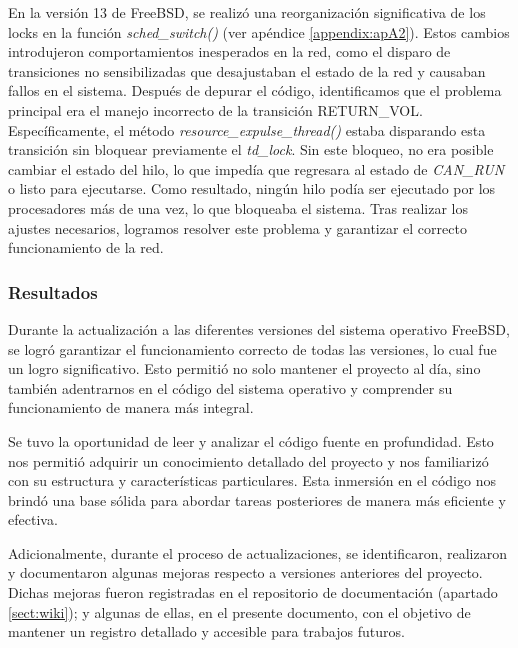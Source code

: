 En la versión 13 de FreeBSD, se realizó una reorganización significativa de los locks en la función \textit{sched\_switch()} (ver apéndice \ref{appendix:apA2}). Estos cambios introdujeron comportamientos inesperados en la red, como el disparo de transiciones no sensibilizadas que desajustaban el estado de la red y causaban fallos en el sistema. Después de depurar el código, identificamos que el problema principal era el manejo incorrecto de la transición RETURN\_VOL. Específicamente, el método \textit{resource\_expulse\_thread()} estaba disparando esta transición sin bloquear previamente el \textit{td\_lock}. Sin este bloqueo, no era posible cambiar el estado del hilo, lo que impedía que regresara al estado de \textit{CAN\_RUN} o listo para ejecutarse. Como resultado, ningún hilo podía ser ejecutado por los procesadores más de una vez, lo que bloqueaba el sistema. Tras realizar los ajustes necesarios, logramos resolver este problema y garantizar el correcto funcionamiento de la red.\par

\subsubsection{Resultados}

Durante la actualización a las diferentes versiones del sistema operativo FreeBSD, se logró garantizar el funcionamiento correcto de todas las versiones, lo cual fue un logro significativo. Esto permitió no solo mantener el proyecto al día, sino también adentrarnos en el código del sistema operativo y comprender su funcionamiento de manera más integral.\par

Se tuvo la oportunidad de leer y analizar el código fuente en profundidad. Esto nos permitió adquirir un conocimiento detallado del proyecto y nos familiarizó con su estructura y características particulares. Esta inmersión en el código nos brindó una base sólida para abordar tareas posteriores de manera más eficiente y efectiva.\par

Adicionalmente, durante el proceso de actualizaciones, se identificaron, realizaron y documentaron algunas mejoras respecto a versiones anteriores del proyecto. Dichas mejoras fueron registradas en el repositorio de documentación (apartado \ref{sect:wiki}); y algunas de ellas, en el presente documento, con el objetivo de mantener un registro detallado y accesible para trabajos futuros.\par

